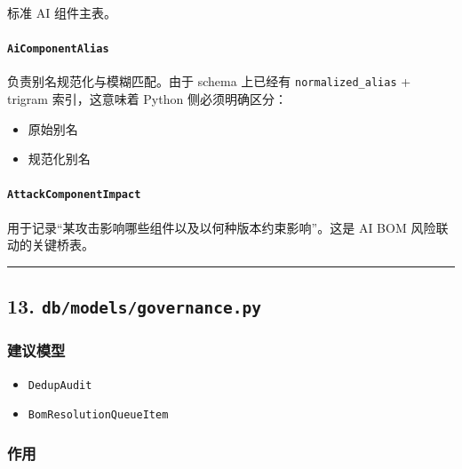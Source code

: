 \documentclass[UTF8]{ctexart}
\providecommand{\tightlist}{%
  \setlength{\itemsep}{0pt}\setlength{\parskip}{0pt}}
\begin{document}
标准 AI 组件主表。

\hypertarget{aicomponentalias}{%
\paragraph{\texorpdfstring{\texttt{AiComponentAlias}}{AiComponentAlias}}\label{aicomponentalias}}

负责别名规范化与模糊匹配。由于 schema 上已经有
\texttt{normalized\_alias} + trigram 索引，这意味着 Python
侧必须明确区分：

\begin{itemize}
\tightlist
\item
  原始别名
\item
  规范化别名
\end{itemize}

\hypertarget{attackcomponentimpact}{%
\paragraph{\texorpdfstring{\texttt{AttackComponentImpact}}{AttackComponentImpact}}\label{attackcomponentimpact}}

用于记录``某攻击影响哪些组件以及以何种版本约束影响''。这是 AI BOM
风险联动的关键桥表。

\begin{center}\rule{0.5\linewidth}{0.5pt}\end{center}

\hypertarget{dbmodelsgovernance.py}{%
\subsection{\texorpdfstring{13.
\texttt{db/models/governance.py}}{13. db/models/governance.py}}\label{dbmodelsgovernance.py}}

\hypertarget{ux5efaux8baeux6a21ux578b-3}{%
\subsubsection{建议模型}\label{ux5efaux8baeux6a21ux578b-3}}

\begin{itemize}
\tightlist
\item
  \texttt{DedupAudit}
\item
  \texttt{BomResolutionQueueItem}
\end{itemize}

\hypertarget{ux4f5cux7528-1}{%
\subsubsection{作用}\label{ux4f5cux7528-1}}
\end{document}

